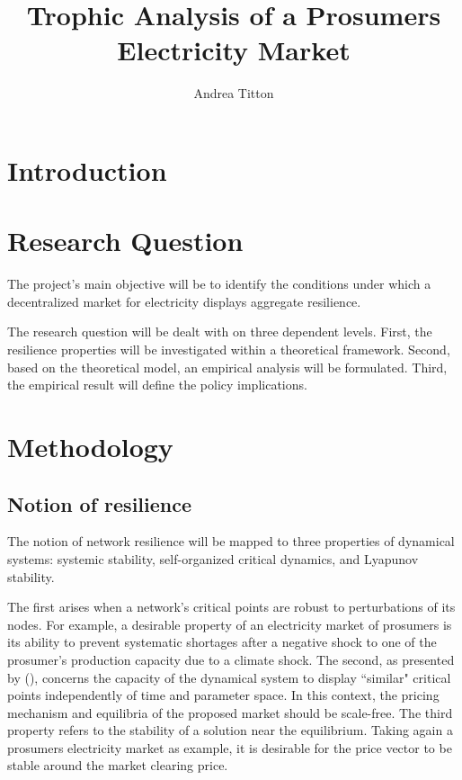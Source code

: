 \documentclass[american]{scrartcl}
\title{
        Trophic Analysis of a Prosumers Electricity Market
    }
\author{Andrea Titton}
\begin{document}
\nocite{*}
\maketitle

\section{Introduction}

\section{Research Question}

The project's main objective will be to identify the conditions under which a decentralized market for electricity displays aggregate resilience.

The research question will be dealt with on three dependent levels. First, the resilience properties will be investigated within a theoretical framework. Second, based on the theoretical model, an empirical analysis will be formulated. Third, the empirical result will define the policy implications.

\section{Methodology}

\subsection{Notion of resilience}

The notion of network resilience will be mapped to three properties of dynamical systems: systemic stability, self-organized critical dynamics, and Lyapunov stability.

The first arises when a network's critical points are robust to perturbations of its nodes. For example, a desirable property of an electricity market of prosumers is its ability to prevent systematic shortages after a negative shock to one of the prosumer's production capacity due to a climate shock. The second, as presented by \citeauthor{Bak1995} (\citeyear{Bak1995}), concerns the capacity of the dynamical system to display ``similar" critical points independently of time and parameter space. In this context, the pricing mechanism and equilibria of the proposed market should be scale-free. The third property refers to the stability of a solution near the equilibrium. Taking again a prosumers electricity market as example, it is desirable for the price vector to be stable around the market clearing price.
\end{document}
